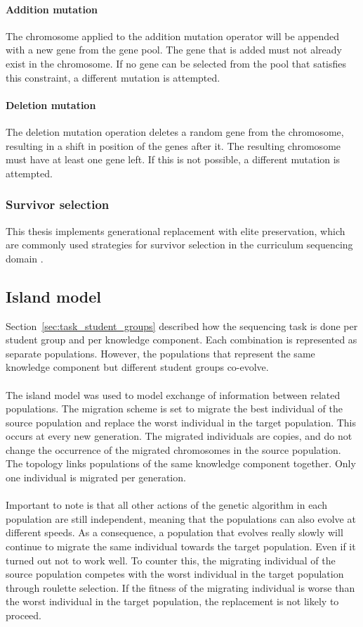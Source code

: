 \paragraph{Addition mutation} The chromosome applied to the addition mutation
operator will be appended with a new gene from the gene pool. The gene that is
added must not already exist in the chromosome. If no gene can be selected from
the pool that satisfies this constraint, a different mutation is attempted.

\paragraph{Deletion mutation} The deletion mutation operation deletes a random
gene from the chromosome, resulting in a shift in position of the genes after
it. The resulting chromosome must have at least one gene left. If this is not
possible, a different mutation is attempted.

\subsubsection{Survivor selection}
\label{sec:approach_survivor_selection}
This thesis implements generational replacement with elite preservation, which
are commonly used strategies for survivor selection in the curriculum
sequencing domain \citep{AlMuhaideb2011}.

\subsection{Island model}
\label{sec:approach_island_model}
Section~\ref{sec:task_student_groups} described how the sequencing task is done
per student group and per knowledge component. Each combination is represented
as separate populations. However, the populations that represent the same
knowledge component but different student groups co-evolve.\\\\
\noindent
The island model was used to model exchange of information between
related populations. The migration scheme is set to migrate the best individual
of the source population and replace the worst individual in the target
population. This occurs at every new
generation. The migrated individuals are copies, and do not change the
occurrence of the migrated chromosomes in the source population. The topology
links populations of the same knowledge component together. Only one individual
is migrated per generation.\\\\
\noindent
Important to note is that all other actions of the genetic algorithm in each
population are still independent, meaning that the populations can also evolve
at different speeds. As a consequence, a population that evolves really slowly
will continue to migrate the same individual towards the target population.
Even if it turned out not to work well. To counter this, the migrating
individual of the source population competes with the worst individual in the
target population through roulette selection. If the fitness of the migrating
individual is worse than the worst individual in the target population, the
replacement is not likely to proceed.
